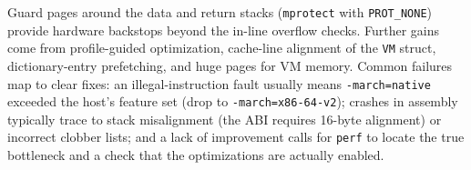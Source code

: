 Guard pages around the data and return stacks (\texttt{mprotect} with
\texttt{PROT\_NONE}) provide hardware backstops beyond the in-line overflow
checks. Further gains come from profile-guided optimization, cache-line
alignment of the \texttt{VM} struct, dictionary-entry prefetching, and huge
pages for VM memory. Common failures map to clear fixes: an illegal-instruction
fault usually means \texttt{-march=native} exceeded the host's feature set
(drop to \texttt{-march=x86-64-v2}); crashes in assembly typically trace to
stack misalignment (the ABI requires 16-byte alignment) or incorrect clobber
lists; and a lack of improvement calls for \texttt{perf} to locate the true
bottleneck and a check that the optimizations are actually enabled.
